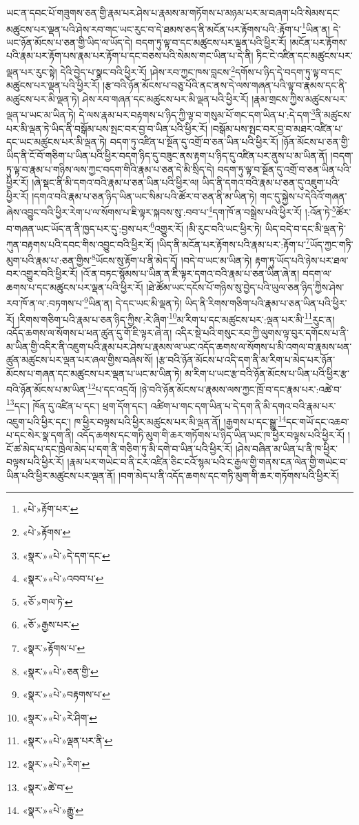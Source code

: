 ཡང་ན་དབང་པོ་གཟུགས་ཅན་གྱི་རྣམ་པར་ཤེས་པ་རྣམས་མ་གཏོགས་པ་མཉམ་པར་མ་བཞག་པའི་སེམས་དང་མཚུངས་པར་ལྡན་པའི་ཤེས་རབ་གང་ཡང་རུང་བ་དེ་ཐམས་ཅད་ནི་མངོན་པར་རྟོགས་པའི་:རྟོག་པ་\footnote{«པེ་»རྟོག་པར་}ཡིན་ན། དེ་ཡང་ཉོན་མོངས་པ་ཅན་གྱི་ཡིད་ལ་ཡོད་དེ། བདག་ཏུ་ལྟ་བ་དང་མཚུངས་པར་ལྡན་པའི་ཕྱིར་རོ། །མངོན་པར་རྟོགས་པའི་རྣམ་པར་རྟོག་པས་རྣམ་པར་རྟོག་པ་དང་བཅས་པའི་སེམས་གང་ཡིན་པ་དེ་ནི། ཏིང་ངེ་འཛིན་དང་མཚུངས་པར་ལྡན་པར་རུང་སྟེ། དེའི་བྱེད་པ་སྣང་བའི་ཕྱིར་རོ། །ཤེས་རབ་ཀྱང་ཁས་བླངས་\footnote{«པེ་»རྟོགས་}དགོས་པ་ཉིད་དེ་བདག་ཏུ་ལྟ་བ་དང་མཚུངས་པར་ལྡན་པའི་ཕྱིར་རོ། །རྩ་བའི་ཉོན་མོངས་པ་བཅུ་པོའི་ནང་ནས་དེ་ལས་གཞན་པའི་ལྟ་བ་རྣམས་དང་ནི་མཚུངས་པར་མི་ལྡན་ཏེ། ཤེས་རབ་གཞན་དང་མཚུངས་པར་མི་ལྡན་པའི་ཕྱིར་རོ། །རྣམ་གྲངས་ཀྱིས་མཚུངས་པར་ལྡན་པ་ཡང་མ་ཡིན་ཏེ། དེ་ལས་རྣམ་པར་བརྟགས་པ་ཉིད་ཀྱི་ལྟ་བ་གསུམ་པོ་གང་དག་ཡིན་པ་:དེ་དག་\footnote{«སྣར་»«པེ་»དེ་དག་དང་}ནི་མཚུངས་པར་མི་ལྡན་ཏེ་ཡིད་ནི་བསྒོམ་པས་སྤང་བར་བྱ་བ་ཡིན་པའི་ཕྱིར་རོ། །བསྒོམ་པས་སྤང་བར་བྱ་བ་མཐར་འཛིན་པ་དང་ཡང་མཚུངས་པར་མི་ལྡན་ཏེ། བདག་ཏུ་འཛིན་པ་སྔོན་དུ་འགྲོ་བ་ཅན་ཡིན་པའི་ཕྱིར་རོ། །ཉོན་མོངས་པ་ཅན་གྱི་ཡིད་ནི་ངོ་བོ་གཅིག་པ་ཡིན་པའི་ཕྱིར་བདག་ཉིད་དུ་བཟུང་ནས་རྟག་པ་ཉིད་དུ་འཛིན་པར་ནུས་པ་མ་ཡིན་ནོ། །བདག་ཏུ་ལྟ་བ་རྣམ་པ་གཉིས་ལས་ཀྱང་བདག་གིའི་རྣམ་པ་ཅན་དེ་མི་སྲིད་དེ། བདག་ཏུ་ལྟ་བ་སྔོན་དུ་འགྲོ་བ་ཅན་ཡིན་པའི་ཕྱིར་རོ། །ཞེ་སྡང་ནི་མི་དགའ་བའི་རྣམ་པ་ཅན་ཡིན་པའི་ཕྱིར་ལ། ཡིད་ནི་དགའ་བའི་རྣམ་པ་ཅན་དུ་འཇུག་པའི་ཕྱིར་རོ། །དགའ་བའི་རྣམ་པ་ཅན་ཉིད་ཡིན་ཡང་སིམ་པའི་ཚོར་བ་ཅན་ནི་མ་ཡིན་ཏེ། གང་དུ་སྐྱེས་པ་དེའིའོ་གཞན་ཞེས་འབྱུང་བའི་ཕྱིར་རེག་པ་ལ་སོགས་པ་ཇི་ལྟར་སྐབས་སུ་:བབ་པ་\footnote{«སྣར་»«པེ་»འབབ་པ་}དག་ཁོ་ན་བསྒྲེས་པའི་ཕྱིར་རོ། །:འོན་ཏེ་\footnote{«ཅོ་»གལ་ཏེ་}ཚོར་བ་གཞན་ཡང་ཡོད་ན་ནི་ཁྱད་པར་དུ་:བྱས་པར་\footnote{«ཅོ་»རྒྱས་པར་}འགྱུར་རོ། །མི་རུང་བའི་ཡང་ཕྱིར་ཏེ། ཡིད་བདེ་བ་དང་མི་ལྡན་ཏེ་ཀུན་བརྟགས་པའི་དབང་གིས་འབྱུང་བའི་ཕྱིར་རོ། །ཡིད་ནི་མངོན་པར་རྟོགས་པའི་རྣམ་པར་:རྟོག་པ་\footnote{«སྣར་»རྟོགས་པ་}ཡོད་ཀྱང་གཏི་མུག་པའི་རྣམ་པ་:ཅན་གྱིས་\footnote{«སྣར་»«པེ་»ཅན་གྱི་}ཡོངས་སུ་རྟོག་པ་ནི་མེད་དོ། །བདེ་བ་ཡང་མ་ཡིན་ཏེ། རྟག་ཏུ་ཡོད་པའི་ཉེས་པར་ཐལ་བར་འགྱུར་བའི་ཕྱིར་རོ། །འོ་ན་བཏང་སྙོམས་པ་ཡིན་ན་ཇི་ལྟར་དགའ་བའི་རྣམ་པ་ཅན་ཡིན་ཞེ་ན། བདག་ལ་ཆགས་པ་དང་མཚུངས་པར་ལྡན་པའི་ཕྱིར་རོ། །ཐེ་ཚོམ་ཡང་དངོས་པོ་གཉིས་སུ་བྱེད་པའི་ཡུལ་ཅན་ཉིད་ཀྱིས་ཤེས་རབ་ཁོ་ན་ལ་:བཏགས་པ་\footnote{«སྣར་»«པེ་»བརྟགས་པ་}ཡིན་ན། དེ་དང་ཡང་མི་ལྡན་ཏེ། ཡིད་ནི་རིགས་གཅིག་པའི་རྣམ་པ་ཅན་ཡིན་པའི་ཕྱིར་རོ། །རིགས་གཅིག་པའི་རྣམ་པ་ཅན་ཉིད་ཀྱིས་:རེ་ཞིག་\footnote{«སྣར་»«པེ་»རེ་ཤིག་}མ་རིག་པ་དང་མཚུངས་པར་:ལྡན་པར་མི་\footnote{«སྣར་»«པེ་»ལྡན་པར་ནི་}རུང་ན། འདོད་ཆགས་ལ་སོགས་པ་ཕན་ཚུན་དུ་གོ་ཇི་ལྟར་ཞེ་ན། འདིར་སྡེ་པའི་གསུང་རབ་ཀྱི་ལུགས་ལྟ་བུར་དགོངས་པ་ནི་མ་ཡིན་གྱི་འདིར་ནི་འཇུག་པའི་རྣམ་པར་ཤེས་པ་རྣམས་ལ་ཡང་འདོད་ཆགས་ལ་སོགས་པ་མི་འགལ་བ་རྣམས་ཕན་ཚུན་མཚུངས་པར་ལྡན་པར་ཞལ་གྱིས་བཞེས་སོ། །རྩ་བའི་ཉོན་མོངས་པ་འདི་དག་ནི་མ་རིག་པ་མེད་པར་ཉོན་མོངས་པ་གཞན་དང་མཚུངས་པར་ལྡན་པ་ཡང་མ་ཡིན་ཏེ། མ་རིག་པ་ཡང་རྩ་བའི་ཉོན་མོངས་པ་ཡིན་པའི་ཕྱིར་རྩ་བའི་ཉོན་མོངས་པ་མ་ཡིན་\footnote{«སྣར་»«པེ་»རིག་}པ་དང་འདྲའོ། །ཉེ་བའི་ཉོན་མོངས་པ་རྣམས་ལས་ཀྱང་ཁྲོ་བ་དང་རྣམ་པར་:འཚེ་བ་\footnote{«སྣར་»ཚེ་བ་}དང་། ཁོན་དུ་འཛིན་པ་དང་། ཕྲག་དོག་དང་། འཚིག་པ་གང་དག་ཡིན་པ་དེ་དག་ནི་མི་དགའ་བའི་རྣམ་པར་འཇུག་པའི་ཕྱིར་དང་། ཁ་ཕྱིར་བལྟས་པའི་ཕྱིར་མཚུངས་པར་མི་ལྡན་ནོ། །རྒྱགས་པ་དང་སྒྱུ་\footnote{«སྣར་»«པེ་»རྒྱུ་}དང་གཡོ་དང་འཆབ་པ་དང་སེར་སྣ་དག་ནི། འདོད་ཆགས་དང་གཏི་མུག་གི་ཆར་གཏོགས་པ་ཉིད་ཡིན་ཡང་ཁ་ཕྱིར་བལྟས་པའི་ཕྱིར་རོ། །ངོ་ཚ་མེད་པ་དང་ཁྲེལ་མེད་པ་དག་ནི་གཅིག་ཏུ་མི་དགེ་བ་ཡིན་པའི་ཕྱིར་རོ། །ཤེས་བཞིན་མ་ཡིན་པ་ནི་ཁ་ཕྱིར་བལྟས་པའི་ཕྱིར་རོ། །རྣམ་པར་གཡེང་བ་ནི་ངར་འཛིན་ཅིང་ངའོ་སྙམ་པའི་ང་རྒྱལ་གྱི་གནས་ངན་ལེན་གྱི་གཡེང་བ་ཡིན་པའི་ཕྱིར་མཚུངས་པར་ལྡན་ནོ། །བག་མེད་པ་ནི་འདོད་ཆགས་དང་གཏི་མུག་གི་ཆར་གཏོགས་པའི་ཕྱིར་རོ། 